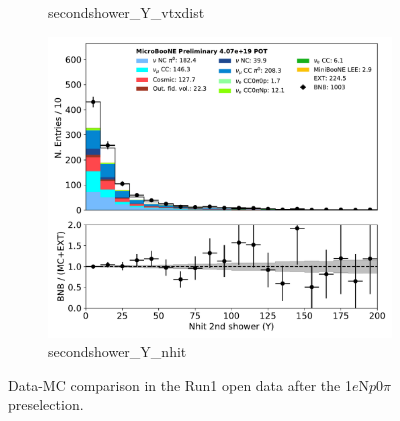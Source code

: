 \documentclass[a4paper]{article}
\newcommand{\npsel}{1$e$N$p$0$\pi$ }
\begin{document}
\begin{figure}[H]
\begin{center}
\begin{subfigure}[b]{0.3\textwidth}
    \caption{\label{fig:1eNp:dataMCRun1:secondshower_Y_vtxdist} secondshower\_Y\_vtxdist }
    \end{subfigure}
    \begin{subfigure}[b]{0.3\textwidth}
    \centering
    \includegraphics[width=1.00\textwidth]{1eNp/dataMCRun1/secondshower_Y_nhit01152020.pdf}
    \caption{\label{fig:1eNp:dataMCRun1:secondshower_Y_nhit} secondshower\_Y\_nhit }
    \end{subfigure}
\caption{\label{fig:1eNp:dataMCRun1:pi01}Data-MC comparison in the Run1 open data after the \npsel preselection.}
\end{center}
\end{figure}
\end{document}
